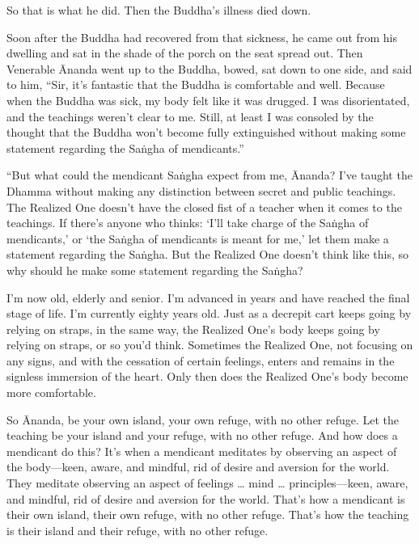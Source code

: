 \documentclass[12pt,openany]{book}%
\begin{document}
So that is what he did. Then the Buddha’s illness died down. 

Soon after the Buddha had recovered from that sickness, he came out from his dwelling and sat in the shade of the porch on the seat spread out. Then Venerable Ānanda went up to the Buddha, bowed, sat down to one side, and said to him, “Sir, it’s fantastic that the Buddha is comfortable and well. Because when the Buddha was sick, my body felt like it was drugged. I was disorientated, and the teachings weren’t clear to me. Still, at least I was consoled by the thought that the Buddha won’t become fully extinguished without making some statement regarding the \textsanskrit{Saṅgha} of mendicants.” 

“But what could the mendicant \textsanskrit{Saṅgha} expect from me, Ānanda? I’ve taught the Dhamma without making any distinction between secret and public teachings. The Realized One doesn’t have the closed fist of a teacher when it comes to the teachings. If there’s anyone who thinks: ‘I’ll take charge of the \textsanskrit{Saṅgha} of mendicants,’ or ‘the \textsanskrit{Saṅgha} of mendicants is meant for me,’ let them make a statement regarding the \textsanskrit{Saṅgha}. But the Realized One doesn’t think like this, so why should he make some statement regarding the \textsanskrit{Saṅgha}? 

I’m now old, elderly and senior. I’m advanced in years and have reached the final stage of life. I’m currently eighty years old. Just as a decrepit cart keeps going by relying on straps, in the same way, the Realized One’s body keeps going by relying on straps, or so you’d think. Sometimes the Realized One, not focusing on any signs, and with the cessation of certain feelings, enters and remains in the signless immersion of the heart. Only then does the Realized One’s body become more comfortable. 

So Ānanda, be your own island, your own refuge, with no other refuge. Let the teaching be your island and your refuge, with no other refuge. And how does a mendicant do this? It’s when a mendicant meditates by observing an aspect of the body—keen, aware, and mindful, rid of desire and aversion for the world. They meditate observing an aspect of feelings … mind … principles—keen, aware, and mindful, rid of desire and aversion for the world. That’s how a mendicant is their own island, their own refuge, with no other refuge. That’s how the teaching is their island and their refuge, with no other refuge. 
\end{document}
